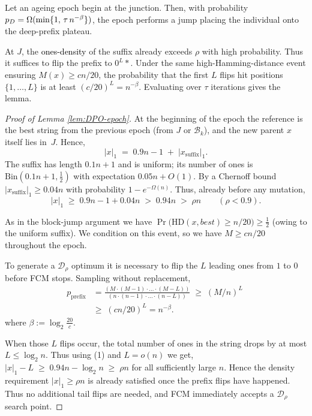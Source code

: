 \begin{lemma} \label{lem:DPO-epoch}
	Let an ageing epoch begin at the junction.
	Then, with probability $\textcolor{black}{p_D}=\Omega(\min\{1,\,\tau\,n^{-\beta}\})$, the epoch performs a jump placing the individual onto the deep-prefix plateau.
\end{lemma}

At $J$, the \textcolor{black}{ones-density} of the suffix already exceeds $\rho$ with high probability.
Thus it suffices to flip the prefix to $0^L *$.
Under the same high-Hamming-distance event ensuring $M(x)\ge cn/20$, the probability that the first $L$ flips hit positions $\{1,\dots,L\}$ is at least $(c/20)^L = n^{-\beta}$.
Evaluating over $\tau$ iterations gives the lemma.

\begin{proof}[Proof of Lemma \ref{lem:DPO-epoch}]
	At the beginning of the epoch the reference is the best string from the previous
	epoch (from $J$ or $\mathcal{B}_k$), and the new parent $x$ itself lies in~$J$.
	Hence,
	\[
	|x|_1\;=\;0.9n-1 \;+\; |x_{\text{suffix}}|_1.
	\]
	The suffix has length $0.1n+1$ and is uniform; its number of ones is
	$\mathrm{Bin}(0.1n+1,\tfrac12)$ with expectation $0.05n+O(1)$.
	By a Chernoff bound
	\(
	|x_{\text{suffix}}|_1\ge 0.04n
	\)
	with probability $1-e^{-\Omega(n)}$.
	Thus, already before any mutation,
	\[
	|x|_1
	\;\ge\;
	0.9n-1 + 0.04n
	\;>\;
	0.94n
	\;>\;
	\rho n
	\qquad(\rho<0.9).
	\tag{1}
	\]
	
	As in the block-jump argument we have
	\(
	\Pr\!\bigl(\mathrm{HD}(x,best)\ge n/20\bigr)\ge\tfrac12
	\)
	(owing to the uniform suffix). We condition on this event, so we have
	 \(M\ge cn/20\) throughout the epoch.
	
	To generate a $\mathcal{D}_\rho$ optimum it is necessary to flip the 
	\(L\) leading ones from $1$ to $0$ before FCM stops.
	Sampling without replacement,
	\begin{align*}
		p_{\text{prefix}}
		&=\frac{(M \cdot (M-1)\cdot  ... \cdot (M-L))}{(n \cdot (n-1)\cdot  ... \cdot (n-L))}
		\;\ge\;
		(M/n)^{L}
		\;\\&\ge\;
		(cn/20)^{L}
		=n^{-\beta}.
	\end{align*}
	where $\beta:=\log_{2}\frac{20}{c}$.
	
	When those $L$ flips occur, the total number of  ones in the string drops by at most
	\( L\le\log_2 n\).
	Thus using (1) and \(L=o(n)\) we get,
	$|x|_1-L\;\ge\;0.94n-\log_2 n
	\;\ge\;\rho n$
	for all sufficiently large $n$.
	Hence the density requirement \(|x|_1\ge\rho n\) is already satisfied
	once the prefix flips have happened. Thus no additional tail flips are needed, and
	FCM immediately accepts a $\mathcal{D}_\rho$ search point.
	

\end{proof}
